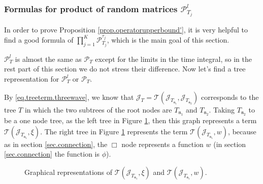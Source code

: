 \subsubsection{Formulas for product of random matrices $\mathcal{P}^l_{T_j}$} In order to prove Proposition \ref{prop.operatorupperbound'}, it is very helpful to find a good formula of  $\prod_{j=1}^K\mathcal{P}^{\tau_j}_{T_j}$, which is the main goal of this section.

$\mathcal{P}^{l}_{T}$ is almost the same as $\mathcal{P}_{T}$ except for the limits in the time integral, so in the rest part of this section we do not stress their difference. Now let's find a tree representation for $\mathcal{P}^{l}_{T}$ or $\mathcal{P}_{T}$.


By \eqref{eq.treeterm.threewave}, we know that $\mathcal{J}_{T}=\mathcal{T}(\mathcal{J}_{T_{\mathfrak{n}_1}}, \mathcal{J}_{T_{\mathfrak{n}_2}})$ corresponds to the tree $T$ in which the two subtrees of the root nodes are $T_{\mathfrak{n}_1}$ and $T_{\mathfrak{n}_2}$. Taking $T_{\mathfrak{n}_2}$ to be a one node tree, as the left tree in Figure \ref{fig.T(J,xi)andT(J,w)}, then this graph represents a term $\mathcal{T}(\mathcal{J}_{T_{\mathfrak{n}_1}}, \xi)$. The right tree in Figure \ref{fig.T(J,xi)andT(J,w)} represents the term $\mathcal{T}(\mathcal{J}_{T_{\mathfrak{n}_1}}, w)$, because as in section \ref{sec.connection}, the $\Box$ node represents a function $w$ (in section \ref{sec.connection} the function is $\phi$).

 \begin{figure}[H]
    \centering
        \caption{Graphical representations of $\mathcal{T}(\mathcal{J}_{T_{\mathfrak{n}_1}}, \xi)$ and $\mathcal{T}(\mathcal{J}_{T_{\mathfrak{n}_1}}, w)$.}
        \label{fig.T(J,xi)andT(J,w)}
    \end{figure}

